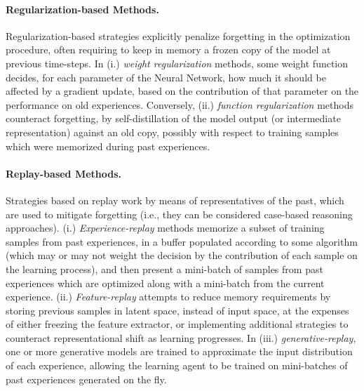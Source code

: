 \paragraph{Regularization-based Methods.} Regularization-based strategies explicitly penalize forgetting in the optimization procedure, often requiring to keep in memory a frozen copy of the model at previous time-steps. In (i.) \textit{weight regularization} methods, some weight function decides, for each parameter of the Neural Network, how much it should be affected by a gradient update, based on the contribution of that parameter on the performance on old experiences. Conversely, (ii.) \textit{function regularization} methods counteract forgetting, by self-distillation of the model output (or intermediate representation) against an old copy, possibly with respect to training samples which were memorized during past experiences.

\paragraph{Replay-based Methods.} Strategies based on replay work by means of representatives of the past, which are used to mitigate forgetting (i.e., they can be considered case-based reasoning approaches). (i.) \textit{Experience-replay} methods memorize a subset of training samples from past experiences, in a buffer populated according to some algorithm (which may or may not weight the decision by the contribution of each sample on the learning process), and then present a mini-batch of samples from past experiences which are optimized along with a mini-batch from the current experience. (ii.) \textit{Feature-replay} attempts to reduce memory requirements by storing previous samples in latent space, instead of input space, at the expenses of either freezing the feature extractor, or implementing additional strategies to counteract representational shift as learning progresses. In (iii.) \textit{generative-replay}, one or more generative models are trained to approximate the input distribution of each experience, allowing the learning agent to be trained on mini-batches of past experiences generated on the fly. 

